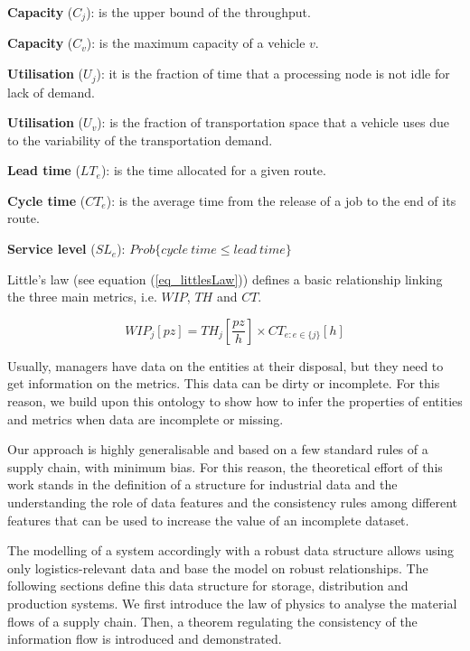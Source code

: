 \textbf{Capacity} ($C_j$): is the upper bound of the throughput.\par

\textbf{Capacity} ($C_v$): is the maximum capacity of a vehicle $v$. \par

\textbf{Utilisation} ($U_j$): it is the fraction of time that a processing node is not idle for lack of demand. \par

\textbf{Utilisation} ($U_v$): is the fraction of transportation space that a vehicle uses due to the variability of the transportation demand. \par

\textbf{Lead time} ($LT_e$): is the time allocated for a given route. \par

\textbf{Cycle time} ($CT_e$): is the average time from the release of a job to the end of its route. \par

\textbf{Service level} ($SL_e$): $Prob\{cycle\ time\le lead\ time\}$

Little’s law (see equation (\ref{eq_littlesLaw})) defines a basic relationship linking the three main metrics, i.e. $WIP$, $TH$ and $CT$.

\begin{equation}
WIP_j [pz]=TH_j \left[\frac{pz}{h}\right] \times CT_{e:e \in \{j\} } [h]
\label{eq_littlesLaw}
\end{equation}

Usually, managers have data on the entities at their disposal, but they need to get information on the metrics. This data can be dirty or incomplete. For this reason, we build upon this ontology to show how to infer the properties of entities and metrics when data are incomplete or missing.\par

Our approach is highly generalisable and based on a few standard rules of a supply chain, with minimum bias. For this reason, the theoretical effort of this work stands in the definition of a structure for industrial data and the understanding the role of data features and the consistency rules among different features that can be used to increase the value of an incomplete dataset.\par

The modelling of a system accordingly with a robust data structure allows using only logistics-relevant data and base the model on robust relationships. The following sections define this data structure for storage, distribution and production systems. We first introduce the law of physics to analyse the material flows of a supply chain. Then, a theorem regulating the consistency of the information flow is introduced and demonstrated.\par


